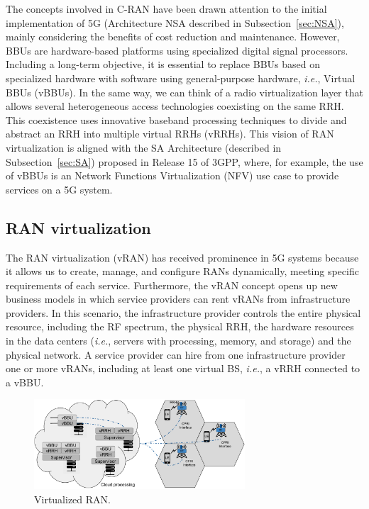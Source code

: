 The concepts involved in C-RAN have been drawn attention to the initial implementation of 5G (Architecture NSA described in Subsection~\ref{sec:NSA}), mainly considering the benefits of cost reduction and maintenance. However, BBUs are hardware-based platforms using specialized digital signal processors. Including a long-term objective, it is essential to replace BBUs based on specialized hardware with software using general-purpose hardware, \textit{i.e.}, Virtual BBUs (vBBUs). In the same way, we can think of a radio virtualization layer that allows several heterogeneous access technologies coexisting on the same RRH. This coexistence uses innovative baseband processing techniques to divide and abstract an RRH into multiple virtual RRHs (vRRHs).  This vision of RAN virtualization is aligned with the SA Architecture (described in Subsection~\ref{sec:SA}) proposed in Release 15 of 3GPP, where, for example, the use of vBBUs is an Network Functions Virtualization (NFV) use case to provide services on a 5G system.


\subsection{RAN virtualization} \label{subsec:VRAN}

The RAN virtualization (vRAN) has received prominence in 5G systems because it allows us to create, manage, and configure RANs dynamically, meeting specific requirements of each service. Furthermore, the vRAN concept opens up new business models in which service providers can rent vRANs from infrastructure providers. In this scenario, the infrastructure provider controls the entire physical resource, including the RF spectrum, the physical RRH, the hardware resources in the data centers (\textit{i.e.}, servers with processing, memory, and storage) and the physical network. A service provider can hire from one infrastructure provider one or more vRANs, including at least one virtual BS, \textit{i.e.}, a vRRH connected to a vBBU.

\begin{figure}[htb]
 \begin{center}
\includegraphics[width=0.7\textwidth]{figs/EvolucaoRAN_2.pdf}
  \end{center}
\caption{Virtualized RAN.}
\label{fig:vRAN}
\end{figure}

